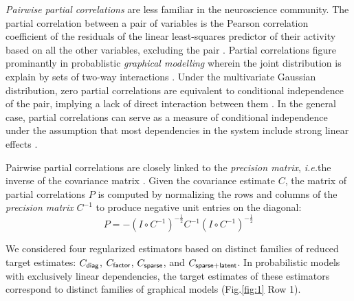 \documentclass[10pt]{article}
\newcommand{\figref}[2]{Fig.\;\ref{fig:#1}\,#2}
\newcommand{\ie}{\emph{i.e.}\;}
\begin{document}
\emph{Pairwise partial correlations} are less familiar in the neuroscience community. 
The partial correlation between a pair of variables is the Pearson correlation coefficient of the residuals of the linear least-squares predictor of their activity based on all the other variables, excluding the pair \cite{Anderson:2003, Whittaker:2009}. Partial correlations figure prominantly in probablistic \emph{graphical modelling} wherein the joint distribution is explain by sets of two-way interactions \cite{Whittaker:1990}. Under the multivariate Gaussian distribution, zero partial correlations are equivalent to conditional independence of the pair, implying a lack of direct interaction between them \cite{Dempster:1972, Whittaker:1990}. In the general case, partial correlations can serve as a measure of conditional independence under the assumption that most dependencies in the system include strong linear effects \cite{Whittaker:1999,Baba:2004}.

Pairwise partial correlations are closely linked to the \emph{precision matrix}, \ie the inverse of the covariance matrix \cite{Dempster:1972,Whittaker:1999}. Given the covariance estimate $C$, the matrix of partial correlations $P$ is computed by normalizing the rows and columns of the \emph{precision matrix} $C^{-1}$ to produce negative unit entries on the diagonal:
\begin{equation}\label{eq:partial}
    P = -\left(I\circ C^{-1}\right)^{-\frac 1 2} C^{-1} \left(I\circ C^{-1}\right)^{-\frac 1 2}
\end{equation}

We considered four regularized estimators based on distinct families of reduced target estimates: $C_{\sf diag}$, $C_{\sf factor}$, $C_{\sf sparse}$, and $C_{\sf sparse+latent}$. In probabilistic models with exclusively linear dependencies, the target estimates of these estimators correspond to distinct families of graphical models (\figref{1}{\,Row 1}).  
\end{document}
